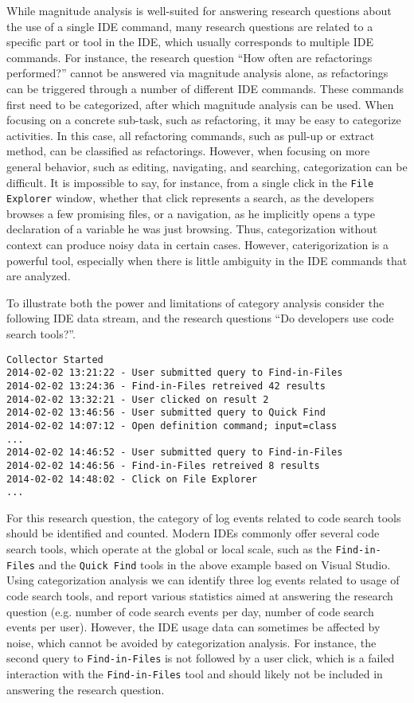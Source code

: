 While magnitude analysis is well-suited for answering research questions about the use of a single IDE command, many research questions are related to a specific part or tool in the IDE, which usually corresponds to multiple IDE commands. For instance, the research question ``How often are refactorings performed?'' cannot be answered via magnitude analysis alone, as refactorings can be triggered through a number of different IDE commands. These commands first need to be categorized, after which magnitude analysis can be used. When focusing on a concrete sub-task, such as refactoring, it may be easy to categorize activities. In this case, all refactoring commands, such as pull-up or extract method, can be classified as refactorings. However, when focusing on more general behavior, such as editing, navigating, and searching, categorization can be difficult. It is impossible to say, for instance, from a single click in the {\tt File Explorer} window, whether that click represents a search, as the developers browses a few promising files, or a navigation, as he implicitly opens a type declaration of a variable he was just browsing. Thus, categorization without context can produce noisy data in certain cases. However, caterigorization is a powerful tool, especially when there is little ambiguity in the IDE commands that are analyzed.

To illustrate both the power and limitations of category analysis consider the following IDE data stream, and the research questions ``Do developers use code search tools?''. 

\begin{verbatim}
Collector Started
2014-02-02 13:21:22 - User submitted query to Find-in-Files
2014-02-02 13:24:36 - Find-in-Files retreived 42 results
2014-02-02 13:32:21 - User clicked on result 2
2014-02-02 13:46:56 - User submitted query to Quick Find
2014-02-02 14:07:12 - Open definition command; input=class
...
2014-02-02 14:46:52 - User submitted query to Find-in-Files
2014-02-02 14:46:56 - Find-in-Files retreived 8 results
2014-02-02 14:48:02 - Click on File Explorer
...
\end{verbatim}

For this research question, the category of log events related to code search tools should be identified and counted. Modern IDEs commonly offer several code search tools, which operate at the global or local scale, such as the {\tt Find-in-Files} and
the {\tt Quick Find} tools in the above example based on Visual Studio. Using categorization analysis we can identify three
log events related to usage of code search tools, and report various statistics aimed at answering the research question (e.g. number of code search events per day, number of code search events per user). However, the IDE usage data can sometimes be affected by noise, which cannot be avoided by categorization analysis. For instance, the second query to {\tt Find-in-Files} is not followed by a user click, which is a failed interaction with the {\tt Find-in-Files} tool and should likely not be included in answering the research question.


